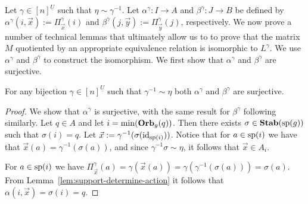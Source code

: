 \documentclass[../paper.tex]{subfiles}
\begin{document}
Let $\gamma \in [n]^{\underline{U}}$ such that $\eta \sim \gamma^{-1}$. Let
$\alpha^{\gamma}: I \rightarrow A$ and $\beta^{\gamma}: J \rightarrow B$ be
defined by $\alpha^{\gamma} (i, \vec{x}) := \Pi^{\gamma}_{\vec{x}}(i)$ and
$\beta^{\gamma} (j, \vec{y}) := \Pi^{\gamma}_{\vec{y}}(j)$, respectively. We now
prove a number of technical lemmas that ultimately allow us to to prove
that the matrix $M$ quotiented by an appropriate equivalence relation is
isomorphic to $L^{\gamma}$.  We use $\alpha^{\gamma}$ and
$\beta^{\gamma}$ to construct the isomorphism. We first show that $\alpha^{\gamma}$ and
$\beta^{\gamma}$ are surjective.

\begin{lem} 
	For any bijection $\gamma \in [n]^{\underline{U}}$ such that $\gamma^{-1} \sim
  \eta$ both $\alpha^{\gamma}$ and $\beta^{\gamma}$ are surjective.
  \label{lem:alpha-beta-surjective}
\end{lem}
\begin{proof}
	We show that $\alpha^{\gamma}$ is surjective, with the same result for
  $\beta^{\gamma}$ following similarly. Let $q \in A$ and let $i = \min
  (\text{\textbf{Orb}}_{g} (q))$. Then there exists $\sigma \in \text{\textbf{Stab}} (\text{sp} (g))$ such that $\sigma
  (i) = q$. Let $\vec{x} := \gamma^{-1} (\sigma (\operatorname{id}_{\text{sp}(i)}))$. Notice that
  for $a \in \text{sp}(i)$ we have that $\vec{x}(a) = \gamma^{-1} (\sigma (a))$,
  and since $\gamma^{-1} \sigma \sim \eta$, it follows that $\vec{x} \in A_i$.
		
	For $a \in \text{sp}(i)$ we have $\Pi^{\gamma}_{\vec{x}} (a) = \gamma
  (\vec{x}(a)) = \gamma (\gamma^{-1} (\sigma (a))) = \sigma (a)$. From
  Lemma~\ref{lem:support-determine-action} it follows that $\alpha(i, \vec{x}) =
  \sigma(i) = q$.
\end{proof}



\end{document}
